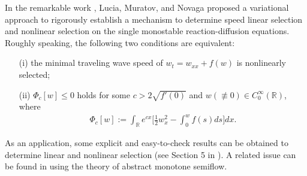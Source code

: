 \documentclass[11pt,a4paper]{article}
\numberwithin{equation}{section}
\numberwithin{figure}{section}
\newcommand\beaa{\begin{eqnarray*}}
\newcommand\eeaa{\end{eqnarray*}}
\begin{document}











In the remarkable work \cite{Lucia Muratov Novaga},
Lucia, Muratov, and Novaga proposed a variational approach to rigorously establish a mechanism to determine speed linear selection and nonlinear selection on the single monostable reaction-diffusion equations. Roughly speaking, the following two conditions are equivalent:
\begin{itemize}
\item[(i)] the minimal traveling wave speed of
$w_t=w_{xx}+f(w)$
is nonlinearly selected;
\item[(ii)] $\Phi_c[w]\leq 0$ holds for some $c>2\sqrt{f'(0)}$ and $w(\not\equiv 0)\in C_0^\infty(\mathbb{R})$, where
\beaa
\Phi_c[w]:=\int_\mathbb{R}e^{cx}\Big[\frac{1}{2}w_x^2-\int_0^wf(s)ds\Big]dx.
\eeaa
\end{itemize}
As an application, some explicit and easy-to-check results can be obtained to determine linear and nonlinear selection (see Section 5 in \cite{Lucia Muratov Novaga}). A related issue can be found in \cite{Ma Ou} using the theory of abstract monotone semiflow. 
\end{document}
